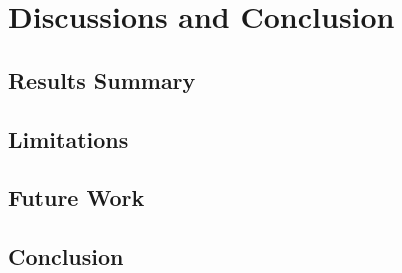 \documentclass[english]{tktltiki2}
\theoremstyle{definition}
\theoremstyle{remark}
\begin{document}
\section{Discussions and Conclusion} %
\subsection{Results Summary} %
\subsection{Limitations} %
\subsection{Future Work} %
\subsection{Conclusion} %

% 




% 
\end{document}
